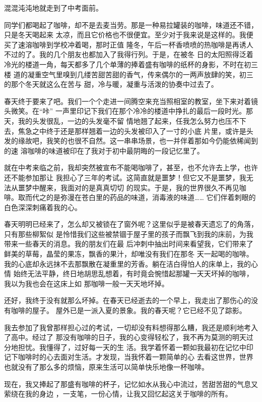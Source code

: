 \documentclass[12pt,a4paper]{article}
\begin{document}
		混混沌沌地就走到了中考面前。

		同学们都喝起了咖啡，却不是去麦当劳。那是一种易拉罐装的咖啡，味道还不错，只是冬天喝起来
	太凉，而且它价格也不很便宜。至少对于我来说是这样的。我便买了速溶咖啡到学校冲着喝，那时正值
	隆冬，午后一杯香喷喷的热咖啡是再诱人不过的了。我的几个朋友也都加入了我得行列。于是，在被冬
	日的太阳照得泛着冷光的楼道一角，每天都多了几个单薄的捧着盛有咖啡的纸杯的身影，不时在初三楼
	道的凝重空气里嗅到几缕苦甜苦甜的香气，传来偶尔的一两声放肆的笑，初三的那个冬天就这么在苦与
	甜，冷与暖，凝重与活泼的协奏中过去了。

		春天终于要来了吧。我们一个个走进一间腾空来充当照相室的教室，坐下来对着镜头微笑。在“咔”
	一声里印记下我们在那个冷冷的楼道中挣扎的最后一段时光。那天，我的头发很乱，一边的头发毫不留
	情地翘了起来，任我怎么努力也压不下去，焦急之中终于还是那样翘着一边的头发被印入了一寸的小底
	片里，或许是头发的缘故吧，我笑的也很不自然。这一串串场景，也一并伴着那如今仍能依稀闻到的速
	溶咖啡的味道被印在了我对于初中最阴晦的一段记忆里了。

		就在中考来临之前，我却突然被宣布不能喝咖啡了，甚至，也不允许去上学，也许还不能参加那让
	我担心了三年的考试。这简直就是噩梦！但它又不是噩梦，我无法从噩梦中醒来，我面对的是真真切切
	的现实。于是，我的世界很久不再见咖啡。取而代之的是弥漫在苍白里的药品的味道，消毒液的味道……
	它们伴着刺眼的白色深深刺痛着我的心。

		春天明明已经来了，怎么却又被锁在了窗外呢？这里似乎是被春天遗忘了的角落，只有那些柳絮似
	是怜惜我们这些被禁锢于屋子里的孩子而飘飞到我的床前，为我带来一些春天的消息。我的朋友们在最
	后冲刺中抽出时间来看望我，它们带来了鲜美的草莓，晶莹的果冻，飘香的果汁，却唯没有我们在那冬
	天一起喝的咖啡。我的心底却永远抹不去那飘散在凝重里的芳香。躺在洁白得怕人的床单上，我的心情
	始终无法平静，终日地胡思乱想着，有时竟会惋惜起那罐一天天坏掉的咖啡，我以为我也会在这床上如
	那咖啡一般一天天地坏掉。

		还好，我终于没有就那么坏掉。在春天已经逝去的一个早上，我走出了那伤心的没有咖啡的屋子。
	屋外已是一派入夏的景象。我的春天呢？它已经不见了踪影。

		我去参加了我曾那样担心过的考试，一切却没有料想得那么糟，我还是顺利地考入了高中。经过了
	那没有咖啡的日子，我的心变得轻松了，我不再为莫测的明天过分地担忧。我懂得了，过好每一天的生
	活。我学着怀着一颗如我最初在记忆中印记下咖啡时的心去面对生活。才发现，当我怀着一颗简单的心
	去看这世界，世界也就没有了那么多的烦恼，原来生活可以简单快乐地像一杯咖啡。

		现在，我又捧起了那盛有咖啡的杯子，记忆如水从我心中流过，苦甜苦甜的气息又萦绕在我的身边
	，一支笔，一份心情，让我又回忆起这关于咖啡的所有。
\end{document}
